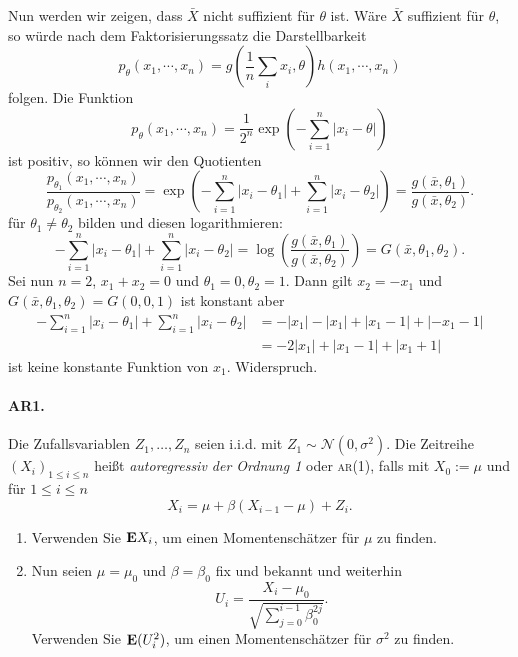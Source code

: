 Nun werden wir zeigen, dass $\bar X$ nicht suffizient für $\theta$ ist. Wäre $\bar X$ 
suffizient für $\theta$, so würde nach dem Faktorisierungssatz die Darstellbarkeit
\begin{equation*}
    p_{\theta}(x_1, \cdots, x_n) = g \left( \frac{1}{n} \sum_{i}^{} x_i, \theta \right) h(x_1, \cdots, x_n)
\end{equation*}
folgen. Die Funktion 
\begin{equation*}
    p_\theta(x_1, \cdots, x_n) = \frac{1}{2^n} \exp \left( - \sum_{i=1}^{n} |x_i - \theta | \right)
\end{equation*}
ist positiv, so können wir den Quotienten 
\begin{equation*}
    \frac{p_{\theta_1}(x_1, \cdots, x_n)}{p_{\theta_2}(x_1, \cdots, x_n)} = 
    \exp \left( - \sum_{i=1}^{n} | x_i - \theta_1 | + \sum_{i=1}^{n} |x_i - \theta_2 | \right) 
    = \frac{g(\bar x,\theta_1) }{ g(\bar x, \theta_2)}. 
\end{equation*}
für $\theta_1 \neq \theta_2$ bilden und diesen logarithmieren:
\begin{equation*}
    - \sum_{i=1}^{n} | x_i - \theta_1 | + \sum_{i=1}^{n} |x_i - \theta_2 | 
    = \log \left( \frac{g(\bar x, \theta_1)}{g(\bar x, \theta_2)} \right) = G(\bar x, \theta_1, \theta_2). 
\end{equation*}
Sei nun $n=2$, $x_1 + x_2 = 0$ und $\theta_1=0, \theta_2 = 1$. Dann gilt $x_2=-x_1$ und 
$G(\bar x, \theta_1, \theta_2)= G(0, 0, 1)$ ist konstant aber 
\begin{align*}
    - \sum_{i=1}^{n} | x_i - \theta_1 | + \sum_{i=1}^{n} |x_i - \theta_2 | 
    &= -|x_1| - |x_1| + |x_1-1| + |-x_1-1| \\
    &= -2 |x_1| + |x_1-1| + |x_1+1|
\end{align*}
ist keine konstante Funktion von $x_1$. Widerspruch.


\paragraph{AR1. }  Die Zufallsvariablen $Z_1,\ldots, Z_n$ seien i.i.d. 
mit $Z_1 \sim \mathcal N(0,\sigma^2)$. Die Zeitreihe $\left( X_i \right)_{1\leq i\leq n}$
heißt \emph{autoregressiv der Ordnung 1} oder \textsc{ar(1)}, falls mit $X_0:= \mu$
und für $1\leq i \leq n$ 
\begin{equation*}
	X_i = \mu + \beta(X_{i-1} - \mu) + Z_i.
\end{equation*}
\begin{enumerate}
	\item Verwenden Sie $\mathbf{E} X_i$, um einen Momentenschätzer für $\mu$ zu finden. 
	\item Nun seien $\mu= \mu_0$ und $\beta=\beta_0$ fix und bekannt und weiterhin
		\begin{equation*}
			U_i = \frac{X_i - \mu_0}{ \sqrt{ \sum_{j=0}^{i-1} \beta^{2j}_0 }}.
		\end{equation*}
		Verwenden Sie $\mathbf{E} (U_i^2)$, um einen Momentenschätzer für $\sigma^2$ zu finden.
\end{enumerate}

